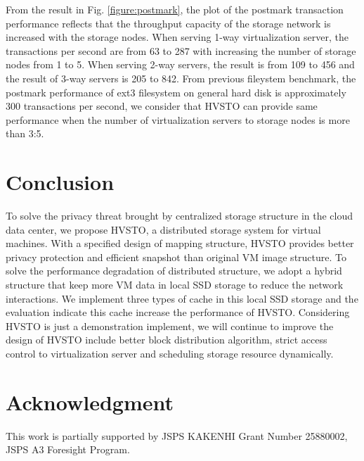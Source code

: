 \documentclass[conference]{IEEEtran}
\begin{document}
From the result in Fig. \ref{figure:postmark}, the plot of the postmark transaction performance reflects that the throughput capacity of the storage network is increased with the storage nodes. When serving 1-way virtualization server, the transactions per second are from 63 to 287 with increasing the number of storage nodes from 1 to 5. When serving 2-way servers, the result is from 109 to 456 and the result of 3-way servers is 205 to 842. From previous fileystem benchmark, the postmark performance of ext3 filesystem on general hard disk is approximately 300 transactions per second, we consider that HVSTO can provide same performance when the number of virtualization servers to storage nodes is more than 3:5.



\section{Conclusion}
To solve the privacy threat brought by centralized storage structure in the cloud data center, we propose HVSTO, a distributed storage system for virtual machines. With a specified design of mapping structure, HVSTO provides better privacy protection and efficient snapshot than original VM image structure. To solve the performance degradation of distributed structure, we adopt a hybrid structure that keep more VM data in local SSD storage to reduce the network interactions. We implement three types of cache in this local SSD storage and the evaluation indicate this cache increase the performance of HVSTO. Considering HVSTO is just a demonstration implement, we will continue to improve the design of HVSTO include better block distribution algorithm, strict access control to virtualization server and scheduling storage resource dynamically.



\section*{Acknowledgment}
This work is partially supported by JSPS KAKENHI Grant Number
25880002, JSPS A3 Foresight Program.





\end{document}
